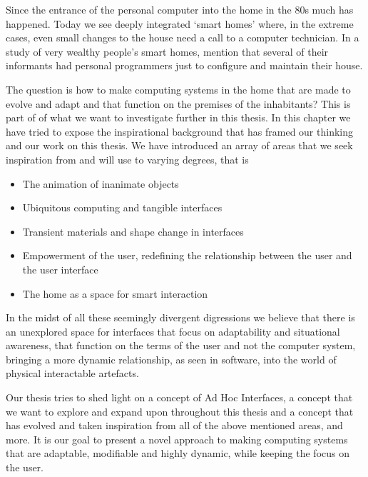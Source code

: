 Since the entrance of the personal computer into the home in the 80s much has happened.
Today we see deeply integrated `smart homes' where, in the extreme cases, even small changes to the house need a call to a computer technician.
In a study of very wealthy people's smart homes, \citet{lynggaard2012had} mention that several of their informants had personal programmers just to configure and maintain their house.

The question is how to make computing systems in the home that are made to evolve and adapt and that function on the premises of the inhabitants? This is part of of what we want to investigate further in this thesis.  
\blank
In this chapter we have tried to expose the inspirational background that has framed our thinking and our work on this thesis. 
We have introduced an array of areas that we seek inspiration from and will use to varying degrees, that is

\begin{itemize}
\item{The animation of inanimate objects}
\item{Ubiquitous computing and tangible interfaces}
\item{Transient materials and shape change in interfaces}
\item{Empowerment of the user, redefining the relationship between the user and the user interface}
\item{The home as a space for smart interaction}
\end{itemize}

In the midst of all these seemingly divergent digressions we believe that there is an unexplored space for interfaces that focus on adaptability and situational awareness, that function on the terms of the user and not the computer system, bringing a more dynamic relationship, as seen in software, into the world of physical interactable artefacts.

Our thesis tries to shed light on a concept of Ad Hoc Interfaces, a concept that we want to explore and expand upon throughout this thesis and a concept that has evolved and taken inspiration from all of the above mentioned areas, and more. 
It is our goal to present a novel approach to making computing systems that are adaptable, modifiable and highly dynamic, while keeping the focus on the user. 